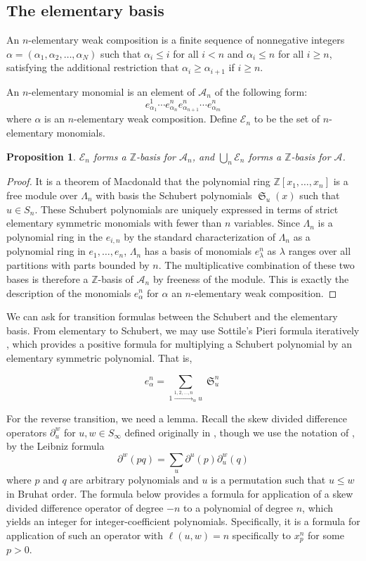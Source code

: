 \documentclass{amsart}
\newtheorem{proposition}[lemma]{Proposition}
\theoremstyle{definition}
\theoremstyle{remark}
\numberwithin{equation}{subsection}
\DeclareMathOperator{\sch}{\mathfrak{S}}
\newcommand{\coma}{\mathcal{A}}
\begin{document}
\subsection{The elementary basis}

An $n$-elementary weak composition is a finite sequence of nonnegative integers $\alpha=(\alpha_1,\alpha_2,\ldots,\alpha_N)$ such that $\alpha_i\leq i$ for all $i<n$ and $\alpha_i\leq n$  for all $i\geq n$, satisfying the additional restriction that $\alpha_i\geq \alpha_{i+1}$ if $i\geq n$.

An $n$-elementary monomial is an element of $\coma_n$ of the following form: 
$$e_{\alpha_1}^{1}\cdots e_{\alpha_n}^ne_{\alpha_{n+1}}^n\cdots e_{\alpha_m}^n$$
where $\alpha$ is an $n$-elementary weak composition. Define $\mathcal{E}_n$ to be the set of $n$-elementary monomials.

\begin{proposition}
	$\mathcal{E}_n$ forms a $\mathbb{Z}$-basis for $\coma_n$, and $\bigcup_{n}\mathcal{E}_n$ forms a $\mathbb{Z}$-basis for $\coma$.
\end{proposition}
\begin{proof}
	It is a theorem of Macdonald that the polynomial ring $\mathbb{Z}[x_1,\ldots,x_n]$ is a free module over $\Lambda_n$ with basis the Schubert polynomials $\sch_u(x)$ such that $u\in S_n$. These Schubert polynomials are uniquely expressed in terms of strict elementary symmetric monomials with fewer than $n$ variables. Since $\Lambda_n$ is a polynomial ring in the $e_{i,n}$ by the standard characterization of $\Lambda_n$ as a polynomial ring in $e_1,\ldots,e_n$, $\Lambda_n$ has a basis of monomials $e_{\lambda}^n$ as $\lambda$ ranges over all partitions with parts bounded by $n$. The multiplicative combination of these two bases is therefore a $\mathbb{Z}$-basis of $\coma_n$ by freeness of the module. This is exactly the description of the monomials $e_{\alpha}^n$ for $\alpha$ an $n$-elementary weak composition.
\end{proof}

We can ask for transition formulas between the Schubert and the elementary basis. From elementary to Schubert, we may use Sottile's Pieri formula iteratively \cite{sottile}, which provides a positive formula for multiplying a Schubert polynomial by an elementary symmetric polynomial. That is,

$$e_{\alpha}^n = \sum_{1\xrightarrow{1,2,\ldots,n}_{\alpha} u}\sch_u^n$$

For the reverse transition, we need a lemma. Recall the skew divided difference operators $\partial_u^w$ for $u,w\in S_\infty$ defined originally in \cite{notes}, though we use the notation of \cite{samuelleibniz}, by the Leibniz formula
$$\partial^w(pq) = \sum_{u} \partial^u(p)\partial_u^w(q)$$
where $p$ and $q$ are arbitrary polynomials and $u$ is a permutation such that $u\leq w$ in Bruhat order. The formula below provides a formula for application of a skew divided difference operator of degree $-n$ to a polynomial of degree $n$, which yields an integer for integer-coefficient polynomials. Specifically, it is a formula for application of such an operator with $\ell(u,w)=n$ specifically to $x_p^n$ for some $p>0$.
\end{document}
